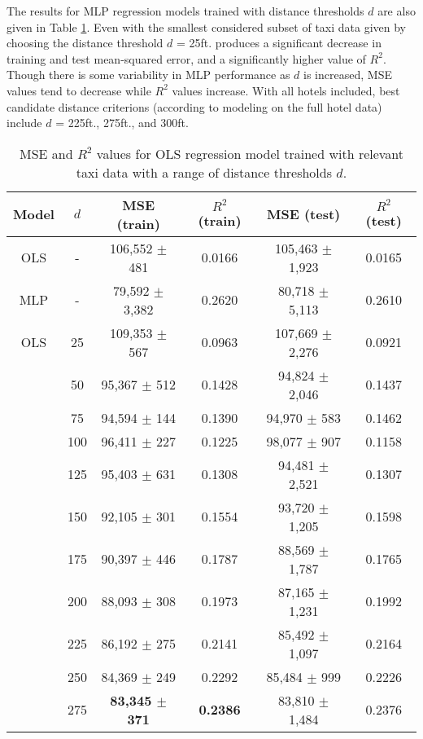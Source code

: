 \documentclass[useAMS, usenatbib]{biom}
\begin{document}
The results for MLP regression models trained with distance thresholds $d$ are also given in Table \ref{t:full_data_performance}. Even with the smallest considered subset of taxi data given by choosing the distance threshold $d$ = 25ft. produces a significant decrease in training and test mean-squared error, and a significantly higher value of $R^2$. Though there is some variability in MLP performance as $d$ is increased, MSE values tend to decrease while $R^2$ values increase. With all hotels included, best candidate distance criterions (according to modeling on the full hotel data) include $d$ = 225ft., 275ft., and 300ft.

\begin{table}
\caption{MSE and $R^2$ values for OLS regression model trained with relevant taxi data with a range of distance thresholds $d$.}
\label{t:full_data_performance}
\begin{center}
\resizebox{\columnwidth}{!}
{
 \begin{tabular}{||c|c|c|c|c|c||}
 \hline
 Model & $d$ & MSE (train) & $R^2$ (train) & MSE (test) & $R^2$ (test) \\
 \hline
 OLS & - & 106,552 $\pm$ 481 & 0.0166 & 105,463 $\pm$ 1,923 & 0.0165 \\
 MLP & - & 79,592 $\pm$ 3,382 & 0.2620 & 80,718 $\pm$ 5,113 & 0.2610 \\
 \hline
 OLS & 25 & 109,353 $\pm$ 567 & 0.0963 & 107,669 $\pm$ 2,276 & 0.0921 \\
 & 50 & 95,367 $\pm$ 512 & 0.1428 & 94,824 $\pm$ 2,046 & 0.1437 \\
 & 75 & 94,594 $\pm$ 144 & 0.1390 & 94,970 $\pm$ 583 & 0.1462 \\
 & 100 & 96,411 $\pm$ 227 & 0.1225 & 98,077 $\pm$ 907 & 0.1158 \\
 & 125 & 95,403 $\pm$ 631 & 0.1308 & 94,481 $\pm$ 2,521 & 0.1307 \\
 & 150 & 92,105 $\pm$ 301 & 0.1554 & 93,720 $\pm$ 1,205 & 0.1598 \\
 & 175 & 90,397 $\pm$ 446 & 0.1787 & 88,569 $\pm$ 1,787 & 0.1765 \\
 & 200 & 88,093 $\pm$ 308 & 0.1973 & 87,165 $\pm$ 1,231 & 0.1992 \\
 & 225 & 86,192 $\pm$ 275 & 0.2141 & 85,492 $\pm$ 1,097 & 0.2164 \\
 & 250 & 84,369 $\pm$ 249 & 0.2292 & 85,484 $\pm$ 999 & 0.2226 \\
 & 275 & \textbf{83,345 $\pm$ 371} & \textbf{0.2386} & 83,810 $\pm$ 1,484 & 0.2376 \\

\end{tabular}}
\end{center}
\end{table}
\end{document}
